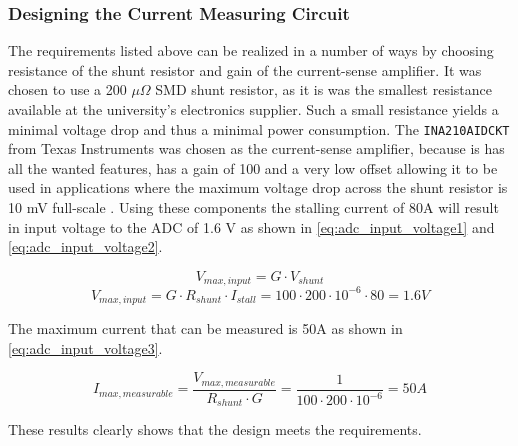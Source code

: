 \subsubsection{Designing the Current Measuring Circuit}
The requirements listed above can be realized in a number of ways by choosing resistance of the shunt resistor and gain of the current-sense amplifier.
It was chosen to use a 200 $\mu \Omega$ SMD shunt resistor, as it is was the smallest resistance available at the university's electronics supplier. 
Such a small resistance yields a minimal voltage drop and thus a minimal power consumption.
The \texttt{INA210AIDCKT} from Texas Instruments was chosen as the current-sense amplifier, because is has all the wanted features, has a gain of 100 and a very low offset allowing it to be used in applications where the maximum voltage drop across the shunt resistor is 10 mV full-scale \cite{INA210AIDCKT}.
Using these components the stalling current of 80A will result in input voltage to the ADC of 1.6 V as shown in \ref{eq:adc_input_voltage1} and \ref{eq:adc_input_voltage2}.

\begin{equation}
	V_{max,input} = G \cdot V_{shunt}
	\label{eq:adc_input_voltage1}
\end{equation}
\begin{equation}
	V_{max,input} = G \cdot R_{shunt} \cdot I_{stall} = 100 \cdot 200\cdot10^{-6} \cdot 80 = 1.6V
	\label{eq:adc_input_voltage2}
\end{equation}

The maximum current that can be measured is 50A as shown in \ref{eq:adc_input_voltage3}.

\begin{equation}
	I_{max, measurable} = \frac{V_{max, measurable}}{R_{shunt}\cdot G} = \frac{1}{100 \cdot 200\cdot10^{-6} } = 50A
	\label{eq:adc_input_voltage3}
\end{equation}

These results clearly shows that the design meets the requirements.
